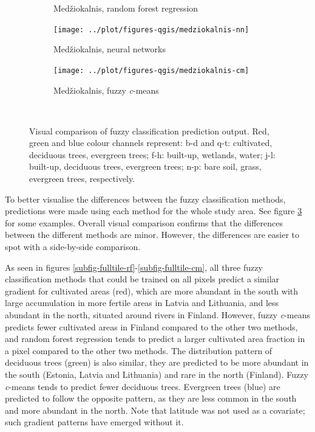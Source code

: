 \documentclass[a4paper,10pt]{book}
\begin{document}
\begin{figure}
\begin{subfigure}[b]{.23\textwidth}
    \caption{Med\v{z}iokalnis, random forest regression}
    \label{subfig-medziokalnis-rf}
  \end{subfigure} \hfill
  \begin{subfigure}[b]{.23\textwidth}
    \texttt{[image: ../plot/figures-qgis/medziokalnis-nn]}
    \caption{Med\v{z}iokalnis, neural networks}
  \end{subfigure} \hfill
  \begin{subfigure}[b]{.23\textwidth}
    \texttt{[image: ../plot/figures-qgis/medziokalnis-cm]}
    \caption{Med\v{z}iokalnis, fuzzy \textit{c}-means}
    \label{subfig-medziokalnis-cm}
  \end{subfigure} \
  \caption{Visual comparison of fuzzy classification prediction output. Red, green and blue colour channels represent: b-d and q-t: cultivated, deciduous trees, evergreen trees; f-h: built-up, wetlands, water; j-l: built-up, deciduous trees, evergreen trees; n-p: bare soil, grass, evergreen trees, respectively.}
  \label{fig-visualcomparison}
\end{figure}

To better visualise the differences between the fuzzy classification methods, predictions were made using each method for the whole study area. See figure \ref{fig-visualcomparison} for some examples. Overall visual comparison confirms that the differences between the different methods are minor. However, the differences are easier to spot with a side-by-side comparison.

As seen in figures \ref{subfig-fulltile-rf}-\ref{subfig-fulltile-cm}, all three fuzzy classification methods that could be trained on all pixels predict a similar gradient for cultivated areas (red), which are more abundant in the south with large accumulation in more fertile areas in Latvia and Lithuania, and less abundant in the north, situated around rivers in Finland. However, fuzzy \textit{c}-means predicts fewer cultivated areas in Finland compared to the other two methods, and random forest regression tends to predict a larger cultivated area fraction in a pixel compared to the other two methods. The distribution pattern of deciduous trees (green) is also similar, they are predicted to be more abundant in the south (Estonia, Latvia and Lithuania) and rare in the north (Finland). Fuzzy \textit{c}-means tends to predict fewer deciduous trees. Evergreen trees (blue) are predicted to follow the opposite pattern, as they are less common in the south and more abundant in the north. Note that latitude was not used as a covariate; such gradient patterns have emerged without it.
\end{document}

